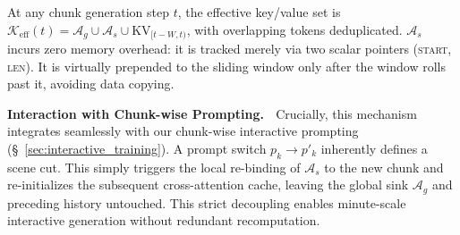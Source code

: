 \documentclass{llmxive}
\begin{document}
At any chunk generation step $t$, the effective key/value set is $\mathcal{K}_{\text{eff}}(t) = \mathcal{A}_{g} \cup \mathcal{A}_{s} \cup \mathrm{KV}_{[t-W, t)}$, with overlapping tokens deduplicated. $\mathcal{A}_{s}$ incurs zero memory overhead: it is tracked merely via two scalar pointers (\textsc{start}, \textsc{len}). It is virtually prepended to the sliding window only after the window rolls past it, avoiding data copying.


\textbf{Interaction with Chunk-wise Prompting.} $\;$
Crucially, this mechanism integrates seamlessly with our chunk-wise interactive prompting (\S~\ref{sec:interactive_training}). A prompt switch $p_{k}\!\to\!p'_{k}$ inherently defines a scene cut. This simply triggers the local re-binding of $\mathcal{A}_{s}$ to the new chunk and re-initializes the subsequent cross-attention cache, leaving the global sink $\mathcal{A}_{g}$ and preceding history untouched. This strict decoupling enables minute-scale interactive generation without redundant recomputation.
\end{document}
